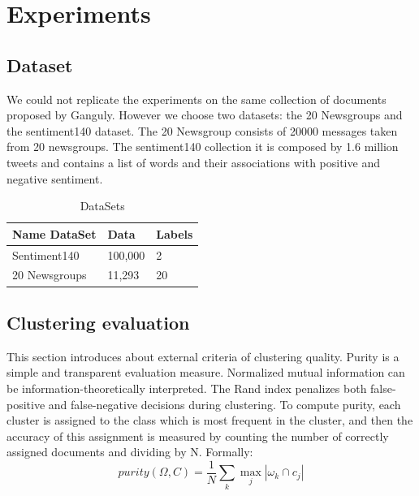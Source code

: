 \documentclass[runningheads]{llncs}
\begin{document}
\section{Experiments}

\subsection{Dataset}

We could not replicate the experiments on the same collection of
documents proposed by Ganguly\cite{ganguly_2018}. However 
we choose two datasets: the 20 Newsgroups and the sentiment140 dataset.
The 20 Newsgroup consists of 20000 messages taken from 20 newsgroups. 
The sentiment140 collection it is composed by 1.6 million tweets and contains a list of words and their associations with positive and negative sentiment.


\begin{table}
\begin{tabular}{|l|l|l|}
\hline
Name DataSet &  Data & Labels\\
\hline
Sentiment140 &  100,000& 2\\
20 Newsgroups & 11,293 & 20\\
\hline
\end{tabular}
\centering
\caption{DataSets}\label{tab1}
\end{table}

%

\subsection{Clustering evaluation}

This section introduces about external criteria of clustering quality. Purity is
a simple and transparent evaluation measure. Normalized mutual information
can be information-theoretically interpreted. The Rand index penalizes both
false-positive and false-negative decisions during clustering.
To compute purity, each cluster is assigned to the class which is most frequent
in the cluster, and then the accuracy of this assignment is measured
by counting the number of correctly assigned documents and dividing by N.
Formally:
\[
purity(\Omega, C) = \frac{1}{N} \sum_k \max_j |\omega_k \cap c_j|
\]
\end{document}

